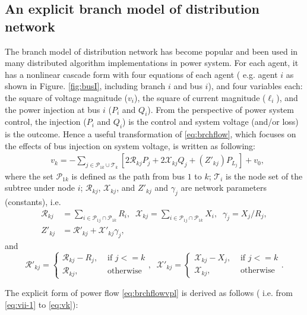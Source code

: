 \documentclass{article}
\begin{document}
\subsection{An explicit branch model of distribution network}
The branch model of distribution network has become popular and been used in many distributed algorithm implementations in power system. For each agent, it has a nonlinear cascade form with four equations of each agent ( e.g. agent $i$ as shown in Figure. \ref{fig:busI}, including branch $i$ and bus $i$), and four variables each: the square of voltage magnitude ($v_i$), the square of current magnitude ($\ell_i$), and the power injection at bus $i$ ($P_i$ and $Q_i$). From the perspective of power system control, the injection ($P_i$ and $Q_i$) is the control and system voltage (and/or loss) is the outcome. Hence a useful transformation of \eqref{eq:brchflow}, which focuses on the effects of bus injection on system voltage, is written as following:
\begin{align}
    &v_k =-\sum_{j\in\mathcal {P}_{1k}\cup \mathcal{T}_k} [2\mathcal{R}_{kj}P_j+ 2\mathcal{X}_{kj}Q_j+(Z'_{kj} )P_{L_j}]+v_0,\label{eq:brchflowvpl}
\end{align}
where the set $\mathcal{P}_{1k}$ is defined as the path from bus $1$ to $k$; $\mathcal{T}_i$ is the node set of the subtree under node $i$; $\mathcal{R}_{kj}$, $\mathcal{X}_{kj}$, and $Z'_{kj}$ and $\gamma_j$ are network parameters (constants), i.e.
\begin{align*}
    \mathcal{R}_{kj}&=\sum_{i\in \mathcal{P}_{1j}\cap\mathcal{P}_{1k}}R_i,\;\;
    \mathcal{X}_{kj}=\sum_{i\in \mathcal{P}_{1j}\cap\mathcal{P}_{1k}}X_i,\;\;\gamma_j=X_j/R_j,\\
    Z'_{kj} &=\mathcal{R}'_{kj}+\mathcal{X}'_{kj}\gamma_j,
\end{align*} and 
\begin{equation*}
\mathcal{R}'_{kj}=
\begin{cases}
\mathcal{R}_{kj} - R_j, &\text{ if } j<=k\\
\mathcal{R}_{kj}, &\text{ otherwise}
\end{cases},\;\;
\mathcal{X}'_{kj}=
\begin{cases}
\mathcal{X}_{kj} - X_j, &\text{ if } j<=k\\
\mathcal{X}_{kj}, &\text{ otherwise}
\end{cases}.
\end{equation*}

The explicit form of power flow \eqref{eq:brchflowvpl} is derived as follows ( i.e. from \eqref{eq:vii-1} to \eqref{eq:vk}):
\end{document}

